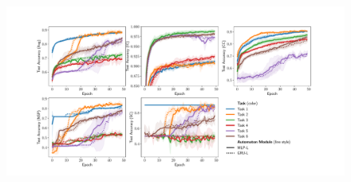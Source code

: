 \begin{figure}[htb!]
	\centering
	\includegraphics[width=\linewidth]{imgs/ijcai/task_validation.pdf}
	\caption{}
	\label{fig:neural-only}
\end{figure}

